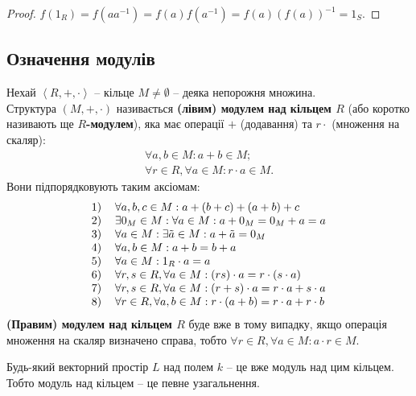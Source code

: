 \documentclass{math_library}
\begin{document}
\begin{proof}
$f(1_R) = f(aa^{-1}) = f(a)f(a^{-1}) = f(a)(f(a))^{-1} = 1_S$.
\end{proof}

\subsection{Означення модулів}
\begin{definition}
Нехай $\left< R,+,\cdot \right>$ -- кільце $M \neq \emptyset$ -- деяка непорожня множина.\\
Структура $(M,+,\cdot)$ називається \textbf{(лівим) модулем над кільцем $R$} (або коротко називають ще \textbf{$R$-модулем}), яка має операції $+$ (додавання) та $r \cdot$ (множення на скаляр):
\begin{align*}
\forall a,b \in M: a+b \in M; \\
\forall r \in R, \forall a \in M: r \cdot a \in M.
\end{align*}
Вони підпорядковують таким аксіомам:
\begin{align*}
	\begin{tabular}{cl}
	1) & $\forall a,b,c \in M: a + (b + c) + (a + b) + c$\\
	2) & $\exists 0_M \in M: \forall a \in M: a + 0_M = 0_M + a = a$\\
	3) & $\forall a \in M: \exists \tilde{a} \in M: a + \tilde{a} = 0_M$\\
	4) & $\forall a,b \in M: a + b = b + a$\\
	5) & $\forall a \in M: 1_R \cdot a = a$\\
	6) & $\forall r,s \in R, \forall a \in M: (rs) \cdot a = r \cdot (s \cdot a)$\\
	7) & $\forall r,s \in R, \forall a \in M: (r+s) \cdot a = r \cdot a + s \cdot a$ \\
	8) & $\forall r \in R, \forall a,b \in M: r \cdot (a+b) = r \cdot a + r \cdot b$
	\end{tabular}
	\end{align*}
\textbf{(Правим) модулем над кільцем $R$} буде вже в тому випадку, якщо операція множення на скаляр визначено справа, тобто $\forall r \in R, \forall a \in M: a \cdot r \in M$.
\end{definition}

\begin{example}
Будь-який векторний простір $L$ над полем $k$ -- це вже модуль над цим кільцем.\\
Тобто модуль над кільцем -- це певне узагальнення.
\end{example}
\end{document}
